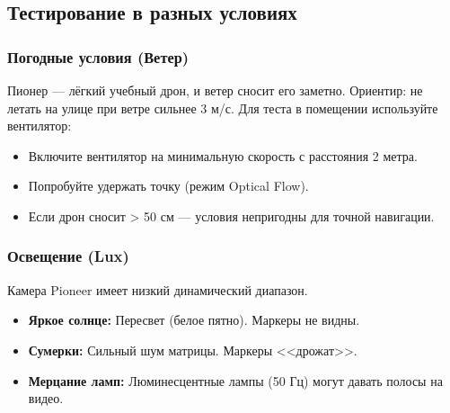 \subsection{Тестирование в разных условиях}

\subsubsection{Погодные условия (Ветер)}
Пионер --- лёгкий учебный дрон, и ветер сносит его заметно. Ориентир: не летать на улице при ветре сильнее 3 м/с.
Для теста в помещении используйте вентилятор:
\begin{itemize}
    \item Включите вентилятор на минимальную скорость с расстояния 2 метра.
    \item Попробуйте удержать точку (режим Optical Flow).
    \item Если дрон сносит > 50 см — условия непригодны для точной навигации.
\end{itemize}

\subsubsection{Освещение (Lux)}
Камера Pioneer имеет низкий динамический диапазон.
\begin{itemize}
    \item \textbf{Яркое солнце:} Пересвет (белое пятно). Маркеры не видны.
    \item \textbf{Сумерки:} Сильный шум матрицы. Маркеры <<дрожат>>.
    \item \textbf{Мерцание ламп:} Люминесцентные лампы (50 Гц) могут давать полосы на видео.
\end{itemize}

